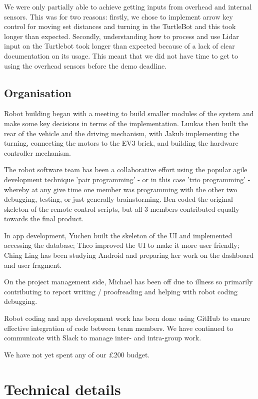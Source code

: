 \documentclass{article}
\begin{document}
We were only partially able to achieve getting inputs from overhead and internal sensors. This was for two reasons: firstly, we chose to implement arrow key control for moving set distances and turning in the TurtleBot and this took longer than expected. Secondly, understanding how to process and use Lidar input on the Turtlebot took longer than expected because of a lack of clear documentation on its usage. This meant that we did not have time to get to using the overhead sensors before the demo deadline.

\subsection{Organisation}

Robot building began with a meeting to build smaller modules of the system and make some key decisions in terms of the implementation. Luukas then built the rear of the vehicle and the driving mechanism, with Jakub implementing the turning, connecting the motors to the EV3 brick, and building the hardware controller mechanism.

The robot software team has been a collaborative effort using the popular agile development technique 'pair programming' - or in this case 'trio programming' - whereby at any give time one member was programming with the other two debugging, testing, or just generally brainstorming. Ben coded the original skeleton of the remote control scripts, but all 3 members contributed equally towards the final product.

In app development, Yuchen built the skeleton of the UI and implemented accessing the database; Theo improved the UI to make it more user friendly; Ching Ling has been studying Android and preparing her work on the dashboard and user fragment.

On the project management side, Michael has been off due to illness so primarily contributing to report writing / proofreading and helping with robot coding debugging. 

Robot coding and app development work has been done using GitHub to ensure effective integration of code between team members. We have continued to communicate with Slack to manage inter- and intra-group work.

We have not yet spent any of our \pounds 200 budget.

\section{Technical details}
\end{document}
